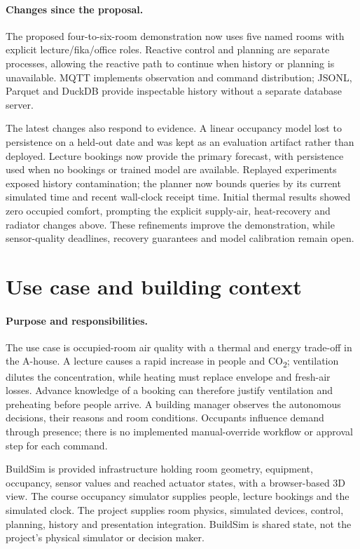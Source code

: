 \documentclass[11pt,a4paper]{article}
\begin{document}
\paragraph{Changes since the proposal.}
The proposed four-to-six-room demonstration now uses five named rooms with explicit lecture/fika/office roles. Reactive control and planning are separate processes, allowing the reactive path to continue when history or planning is unavailable. MQTT implements observation and command distribution; JSONL, Parquet and DuckDB provide inspectable history without a separate database server.

The latest changes also respond to evidence. A linear occupancy model lost to persistence on a held-out date and was kept as an evaluation artifact rather than deployed. Lecture bookings now provide the primary forecast, with persistence used when no bookings or trained model are available. Replayed experiments exposed history contamination; the planner now bounds queries by its current simulated time and recent wall-clock receipt time. Initial thermal results showed zero occupied comfort, prompting the explicit supply-air, heat-recovery and radiator changes above. These refinements improve the demonstration, while sensor-quality deadlines, recovery guarantees and model calibration remain open.

\section{Use case and building context}
\paragraph{Purpose and responsibilities.}
The use case is occupied-room air quality with a thermal and energy trade-off in the A-house. A lecture causes a rapid increase in people and CO\textsubscript{2}; ventilation dilutes the concentration, while heating must replace envelope and fresh-air losses. Advance knowledge of a booking can therefore justify ventilation and preheating before people arrive. A building manager observes the autonomous decisions, their reasons and room conditions. Occupants influence demand through presence; there is no implemented manual-override workflow or approval step for each command.

BuildSim is provided infrastructure holding room geometry, equipment, occupancy, sensor values and reached actuator states, with a browser-based 3D view. The course occupancy simulator supplies people, lecture bookings and the simulated clock. The project supplies room physics, simulated devices, control, planning, history and presentation integration. BuildSim is shared state, not the project's physical simulator or decision maker.
\end{document}
